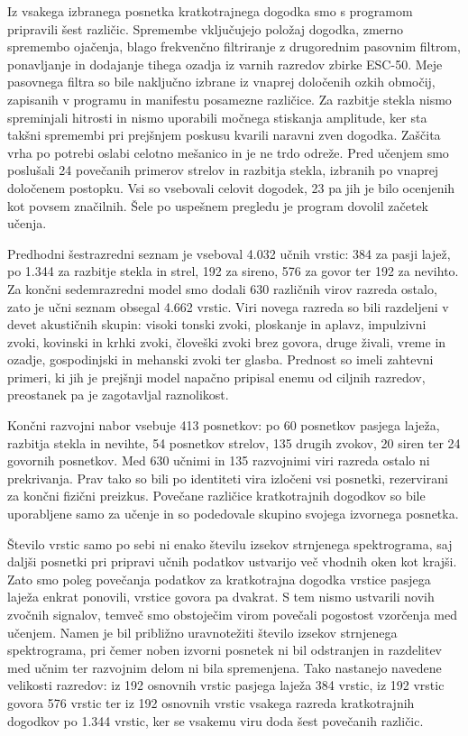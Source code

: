 Iz vsakega izbranega posnetka kratkotrajnega dogodka smo s programom
 pripravili šest različic.
Spremembe vključujejo položaj dogodka, zmerno spremembo ojačenja, blago
frekvenčno filtriranje z drugorednim pasovnim filtrom, ponavljanje in dodajanje tihega ozadja iz varnih razredov
zbirke ESC-50. Meje pasovnega filtra so bile naključno izbrane iz vnaprej
določenih ozkih območij, zapisanih v programu in manifestu posamezne različice.
Za razbitje stekla nismo spreminjali hitrosti in nismo uporabili močnega
stiskanja amplitude, ker sta takšni spremembi pri prejšnjem poskusu kvarili
naravni zven dogodka. Zaščita vrha po potrebi oslabi celotno mešanico in je ne
trdo odreže. Pred učenjem smo poslušali 24 povečanih primerov strelov in
razbitja stekla, izbranih po vnaprej določenem postopku. Vsi so vsebovali
celovit dogodek, 23 pa jih je bilo ocenjenih kot povsem značilnih. Šele po
uspešnem pregledu je program dovolil začetek učenja.

Predhodni šestrazredni seznam je vseboval 4.032 učnih vrstic: 384 za pasji
lajež, po 1.344 za razbitje stekla in strel, 192 za sireno, 576 za govor ter
192 za nevihto. Za končni sedemrazredni model smo dodali 630 različnih virov
razreda ostalo, zato je učni seznam obsegal 4.662 vrstic. Viri novega razreda so
bili razdeljeni v devet akustičnih skupin: visoki tonski zvoki, ploskanje in
aplavz, impulzivni zvoki, kovinski in krhki zvoki, človeški zvoki brez govora,
druge živali, vreme in ozadje, gospodinjski in mehanski zvoki ter glasba.
Prednost so imeli zahtevni primeri, ki jih je prejšnji model napačno pripisal
enemu od ciljnih razredov, preostanek pa je zagotavljal raznolikost.

Končni razvojni nabor vsebuje 413 posnetkov: po 60 posnetkov pasjega laježa,
razbitja stekla in nevihte, 54 posnetkov strelov, 135 drugih zvokov, 20 siren
ter 24 govornih posnetkov. Med 630 učnimi in 135 razvojnimi viri razreda ostalo
ni prekrivanja. Prav tako so bili po identiteti vira izločeni vsi posnetki,
rezervirani za končni fizični preizkus. Povečane različice kratkotrajnih
dogodkov so bile uporabljene samo za učenje in so podedovale skupino svojega
izvornega posnetka.

Število vrstic samo po sebi ni enako številu izsekov strnjenega spektrograma, saj daljši
posnetki pri pripravi učnih podatkov ustvarijo več vhodnih oken kot krajši.
Zato smo poleg povečanja podatkov za kratkotrajna dogodka vrstice pasjega
laježa enkrat ponovili, vrstice govora pa dvakrat. S tem nismo ustvarili novih zvočnih
signalov, temveč smo obstoječim virom povečali pogostost vzorčenja med učenjem.
Namen je bil približno uravnotežiti število izsekov strnjenega spektrograma, pri čemer
noben izvorni posnetek ni bil odstranjen in razdelitev med učnim ter razvojnim
delom ni bila spremenjena. Tako nastanejo navedene velikosti razredov: iz 192
osnovnih vrstic pasjega laježa 384 vrstic, iz 192 vrstic govora 576 vrstic ter
iz 192 osnovnih vrstic vsakega razreda kratkotrajnih dogodkov po 1.344 vrstic,
ker se vsakemu viru doda šest povečanih različic.


